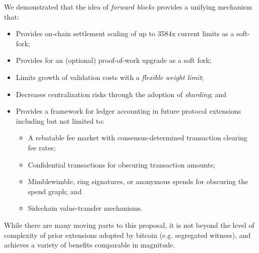We demonstrated that the idea of \emph{forward blocks} provides a
unifying mechanism that:

\begin{itemize}

\item

  Provides on-chain settlement scaling of up to \num{3584}x current
  limits as a soft-fork;

\item

  Provides for an (optional) proof-of-work upgrade as a soft fork;

\item

  Limits growth of validation costs with a \emph{flexible weight
    limit};

\item

  Decreases centralization risks through the adoption of
  \emph{sharding}; and

\item

  Provides a framework for ledger accounting in future protocol
  extensions including but not limited to:

  \begin{itemize}

  \item

    A rebatable fee market with consensus-determined transaction clearing fee rates;

  \item

    Confidential transactions for obscuring transaction amounts;

  \item

    Mimblewimble, ring signatures, or anonymous spends for obscuring the spend graph; and

  \item

    Sidechain value-transfer mechanisms.

  \end{itemize}

\end{itemize}

While there are many moving parts to this proposal, it is not beyond
the level of complexity of prior extensions adopted by bitcoin
(e.g. segregated witness), and achieves a variety of benefits
comparable in magnitude.
